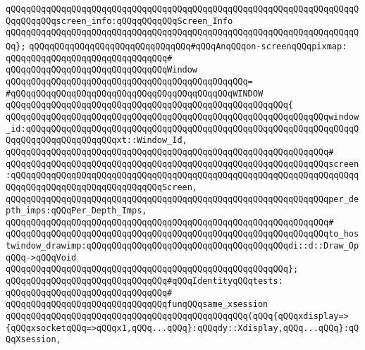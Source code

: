 \verb|qQQqqQQqqQQqqQQqqQQqqQQqqQQqqQQqqQQqqQQqqQQqqQQqqQQqqQQqqQQqqQQqqQQqqQQqqQQqqQQqscreen_info:qQQqqQQqqQQqScreen_Info|\newline
\verb|qQQqqQQqqQQqqQQqqQQqqQQqqQQqqQQqqQQqqQQqqQQqqQQqqQQqqQQqqQQqqQQqqQQqqQQq};|\newline
\newline
\verb|qQQqqQQqqQQqqQQqqQQqqQQqqQQqqQQq#qQQqAnqQQqon-screenqQQqpixmap:|\newline
\verb|qQQqqQQqqQQqqQQqqQQqqQQqqQQqqQQq#|\newline
\verb|qQQqqQQqqQQqqQQqqQQqqQQqqQQqqQQqWindow|\newline
\verb|qQQqqQQqqQQqqQQqqQQqqQQqqQQqqQQqqQQqqQQqqQQqqQQq=|\newline
\verb|#qQQqqQQqqQQqqQQqqQQqqQQqqQQqqQQqqQQqqQQqqQQqWINDOW|\newline
\verb|qQQqqQQqqQQqqQQqqQQqqQQqqQQqqQQqqQQqqQQqqQQqqQQqqQQqqQQq{|\newline
\verb|qQQqqQQqqQQqqQQqqQQqqQQqqQQqqQQqqQQqqQQqqQQqqQQqqQQqqQQqqQQqqQQqwindow_id:qQQqqQQqqQQqqQQqqQQqqQQqqQQqqQQqqQQqqQQqqQQqqQQqqQQqqQQqqQQqqQQqqQQqqQQqqQQqqQQqqQQqqQQqxt::Window_Id,|\newline
\verb|qQQqqQQqqQQqqQQqqQQqqQQqqQQqqQQqqQQqqQQqqQQqqQQqqQQqqQQqqQQqqQQq#|\newline
\verb|qQQqqQQqqQQqqQQqqQQqqQQqqQQqqQQqqQQqqQQqqQQqqQQqqQQqqQQqqQQqqQQqscreen:qQQqqQQqqQQqqQQqqQQqqQQqqQQqqQQqqQQqqQQqqQQqqQQqqQQqqQQqqQQqqQQqqQQqqQQqqQQqqQQqqQQqqQQqqQQqqQQqqQQqScreen,|\newline
\verb|qQQqqQQqqQQqqQQqqQQqqQQqqQQqqQQqqQQqqQQqqQQqqQQqqQQqqQQqqQQqqQQqper_depth_imps:qQQqPer_Depth_Imps,|\newline
\verb|qQQqqQQqqQQqqQQqqQQqqQQqqQQqqQQqqQQqqQQqqQQqqQQqqQQqqQQqqQQqqQQq#|\newline
\verb|qQQqqQQqqQQqqQQqqQQqqQQqqQQqqQQqqQQqqQQqqQQqqQQqqQQqqQQqqQQqqQQqto_hostwindow_drawimp:qQQqqQQqqQQqqQQqqQQqqQQqqQQqqQQqqQQqqQQqdi::d::Draw_OpqQQq->qQQqVoid|\newline
\verb|qQQqqQQqqQQqqQQqqQQqqQQqqQQqqQQqqQQqqQQqqQQqqQQqqQQqqQQq};|\newline
\newline
\verb|qQQqqQQqqQQqqQQqqQQqqQQqqQQqqQQq#qQQqIdentityqQQqtests:|\newline
\verb|qQQqqQQqqQQqqQQqqQQqqQQqqQQqqQQq#|\newline
\verb|qQQqqQQqqQQqqQQqqQQqqQQqqQQqqQQqfunqQQqsame_xsession|\newline
\verb|qQQqqQQqqQQqqQQqqQQqqQQqqQQqqQQqqQQqqQQqqQQqqQQq(qQQq{qQQqxdisplay=>{qQQqxsocketqQQq=>qQQqx1,qQQq...qQQq}:qQQqdy::Xdisplay,qQQq...qQQq}:qQQqXsession,|\newline
